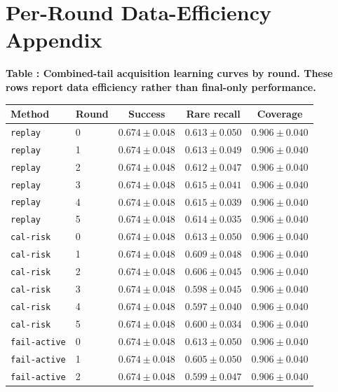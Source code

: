 \documentclass{article}
\begin{document}
\section{Per-Round Data-Efficiency Appendix}\label{sec:roundappendix}
\tiny
\setlength{\tabcolsep}{2pt}
\begin{center}
\label{tab:roundcombined}\textbf{Table \thetable: Combined-tail acquisition learning curves by round. These rows report data efficiency rather than final-only performance.}\\[0.4ex]
\begin{tabular}{llccc}
\toprule
Method & Round & Success & Rare recall & Coverage \\
\midrule
\texttt{replay} & 0 & $0.674 \pm 0.048$ & $0.613 \pm 0.050$ & $0.906 \pm 0.040$ \\
\texttt{replay} & 1 & $0.674 \pm 0.048$ & $0.613 \pm 0.049$ & $0.906 \pm 0.040$ \\
\texttt{replay} & 2 & $0.674 \pm 0.048$ & $0.612 \pm 0.047$ & $0.906 \pm 0.040$ \\
\texttt{replay} & 3 & $0.674 \pm 0.048$ & $0.615 \pm 0.041$ & $0.906 \pm 0.040$ \\
\texttt{replay} & 4 & $0.674 \pm 0.048$ & $0.615 \pm 0.039$ & $0.906 \pm 0.040$ \\
\texttt{replay} & 5 & $0.674 \pm 0.048$ & $0.614 \pm 0.035$ & $0.906 \pm 0.040$ \\
\texttt{cal-risk} & 0 & $0.674 \pm 0.048$ & $0.613 \pm 0.050$ & $0.906 \pm 0.040$ \\
\texttt{cal-risk} & 1 & $0.674 \pm 0.048$ & $0.609 \pm 0.048$ & $0.906 \pm 0.040$ \\
\texttt{cal-risk} & 2 & $0.674 \pm 0.048$ & $0.606 \pm 0.045$ & $0.906 \pm 0.040$ \\
\texttt{cal-risk} & 3 & $0.674 \pm 0.048$ & $0.598 \pm 0.045$ & $0.906 \pm 0.040$ \\
\texttt{cal-risk} & 4 & $0.674 \pm 0.048$ & $0.597 \pm 0.040$ & $0.906 \pm 0.040$ \\
\texttt{cal-risk} & 5 & $0.674 \pm 0.048$ & $0.600 \pm 0.034$ & $0.906 \pm 0.040$ \\
\texttt{fail-active} & 0 & $0.674 \pm 0.048$ & $0.613 \pm 0.050$ & $0.906 \pm 0.040$ \\
\texttt{fail-active} & 1 & $0.674 \pm 0.048$ & $0.605 \pm 0.050$ & $0.906 \pm 0.040$ \\
\texttt{fail-active} & 2 & $0.674 \pm 0.048$ & $0.599 \pm 0.047$ & $0.906 \pm 0.040$ \\

\end{tabular}
\end{center}
\end{document}
